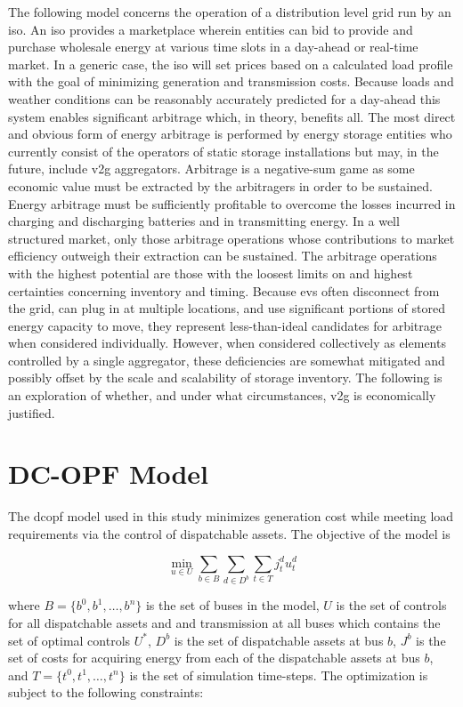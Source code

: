 \documentclass[12pt]{article}
\begin{document}
The following model concerns the operation of a distribution level grid run by an \gls{iso}. An \gls{iso} provides a marketplace wherein entities can bid to provide and purchase wholesale energy at various time slots in a day-ahead or real-time market. In a generic case, the \gls{iso} will set prices based on a calculated load profile with the goal of minimizing generation and transmission costs. Because loads and weather conditions can be reasonably accurately predicted for a day-ahead this system enables significant arbitrage which, in theory, benefits all. The most direct and obvious form of energy arbitrage is performed by energy storage entities who currently consist of the operators of static storage installations but may, in the future, include \gls{v2g} aggregators. Arbitrage is a negative-sum game as some economic value must be extracted by the arbitragers in order to be sustained. Energy arbitrage must be sufficiently profitable to overcome the losses incurred in charging and discharging batteries and in transmitting energy. In a well structured market, only those arbitrage operations whose contributions to market efficiency outweigh their extraction can be sustained. The arbitrage operations with the highest potential are those with the loosest limits on and highest certainties concerning inventory and timing. Because \glspl{ev} often disconnect from the grid, can plug in at multiple locations, and use significant portions of stored energy capacity to move, they represent less-than-ideal candidates for arbitrage when considered individually. However, when considered collectively as elements controlled by a single aggregator, these deficiencies are somewhat mitigated and possibly offset by the scale and scalability of storage inventory. The following is an exploration of whether, and under what circumstances, \gls{v2g} is economically justified.

\section*{DC-OPF Model}

The \gls{dcopf} model used in this study minimizes generation cost while meeting load requirements via the control of dispatchable assets. The objective of the model is

\begin{equation}
	\min_{u\in U}\sum_{b\in B}\sum_{d\in D^b}\sum_{t\in T} j^{d}_tu^{d}_t
\end{equation}

where $B=\{b^0, b^1, \dots, b^n\}$ is the set of buses in the model,  $U$ is the set of controls for all dispatchable assets and and transmission at all buses which contains the set of optimal controls $U^{*}$, $D^b$ is the set of dispatchable assets at bus $b$, $J^b$ is the set of costs for acquiring energy from each of the dispatchable assets at bus $b$, and $T=\{t^0, t^1, \dots, t^n\}$ is the set of simulation time-steps. The optimization is subject to the following constraints:
\end{document}
